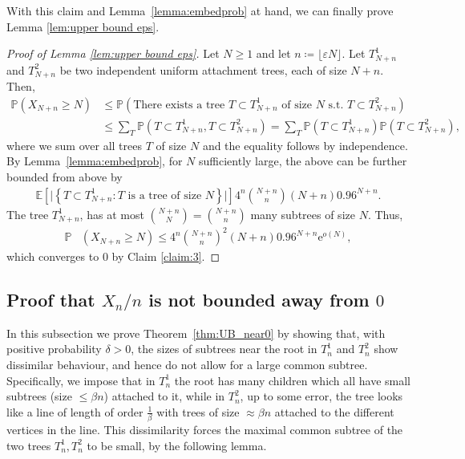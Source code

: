 \documentclass[11pt]{article}
\numberwithin{equation}{section}
\newcommand{\p}{\mathbb{P}} %
\newcommand{\E}{\mathbb{E}} %
\newcommand{\eps}{\varepsilon} %
\newcommand{\e}{\mathrm e}
\theoremstyle{definition}
\begin{document}
\noindent With this claim and Lemma~\ref{lemma:embedprob} at hand, we can finally prove Lemma \ref{lem:upper bound eps}.

\begin{proof}[Proof of Lemma \ref{lem:upper bound eps}]
    Let $N \geq 1$ and let $n \coloneqq \lfloor \eps N \rfloor$.
    Let  $T^1_{N+n}$ and $T^2_{N+n}$ be two independent uniform attachment trees, each of size $N+n$. Then, 
    \begin{align*}
        \p  \left( X_{N+n} \geq N \right)
        &\leq \p \left( \text{There exists a tree } T \subset T_{N+n}^1 \text{ of size $N$ s.t. }   T  \subset T_{N+n}^2  \right)
        \\
        &
        \leq \sum_T \p \left( T \subset T_{N+n}^1,  T \subset T_{N+n}^2 \right)
        =
        \sum_T \p \left( T \subset T_{N+n}^1 \right) \p \left( T \subset T_{N+n}^2 \right),
    \end{align*}
    where we sum over all trees $T$ of size $N$ and the equality follows by independence. By Lemma~\ref{lemma:embedprob}, for $N$ sufficiently large, the above can be further bounded from above by
    \begin{align*}
        \E \left[ \Big|\left\{  T \subset T_{N+n}^1  :  \text{$T$ is a tree of size $N$} \right\} \Big| \right] 4^n \binom{N+n}{n} (N+n) 0.96^{N+n}.
    \end{align*}
    The tree $T_{N+n}^1$, has at most $\binom{N+n}{N} = \binom{N+n}{n}$ many subtrees of size $N$. Thus,
    \begin{align*}
        \p & \left( X_{N+n} \geq N \right)
        \leq 
        4^n \binom{N+n}{n}^2   (N+n) 0.96^{N+n} \e^{o(N)} ,
    \end{align*}
    which converges to $0$ by Claim \ref{claim:3}.
\end{proof}


\subsection{Proof that $X_{n}/n$ is not bounded away from $0$} \label{subsec:not_bdd_0}

In this subsection we prove Theorem~\ref{thm:UB_near0} by showing that, with positive probability $\delta>0$, the sizes of subtrees near the root in $T_n^1$ and $T_n^2$ show dissimilar behaviour, and hence do not allow for a large common subtree. Specifically, we impose that in $T_n^1$ the root has many children which all have small subtrees (size $\leq \beta n$) attached to it, while in $T_n^2$, up to some error, the tree looks like a line of length of order $\frac{1}{\beta}$ with trees of size $\approx \beta n$ attached to the different vertices in the line.
This dissimilarity forces the  maximal common subtree of the two trees $T_n^1, T_n^2$ to be small, by the following lemma.
\end{document}
